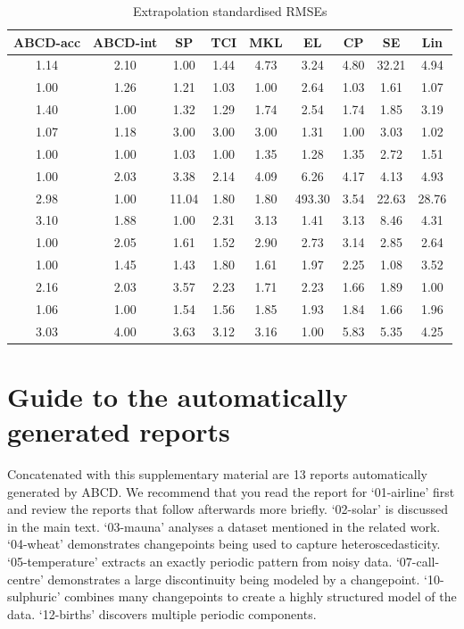 \documentclass[letterpaper]{article}
\newcommand{\procedurename}{ABCD}
\begin{document}
\begin{table}[ht]
\center
\begin{tabular}{|c|c|c|c|c|c|c|c|c|}
\hline
\procedurename{}-acc & \procedurename{}-int & SP & TCI & MKL & EL & CP & SE & Lin \\
\hline
1.14 & 2.10 & 1.00 & 1.44 & 4.73 & 3.24 & 4.80 & 32.21 & 4.94\\
1.00 & 1.26 & 1.21 & 1.03 & 1.00 & 2.64 & 1.03 & 1.61 & 1.07\\
1.40 & 1.00 & 1.32 & 1.29 & 1.74 & 2.54 & 1.74 & 1.85 & 3.19\\
1.07 & 1.18 & 3.00 & 3.00 & 3.00 & 1.31 & 1.00 & 3.03 & 1.02\\
1.00 & 1.00 & 1.03 & 1.00 & 1.35 & 1.28 & 1.35 & 2.72 & 1.51\\
1.00 & 2.03 & 3.38 & 2.14 & 4.09 & 6.26 & 4.17 & 4.13 & 4.93\\
2.98 & 1.00 & 11.04 & 1.80 & 1.80 & 493.30 & 3.54 & 22.63 & 28.76\\
3.10 & 1.88 & 1.00 & 2.31 & 3.13 & 1.41 & 3.13 & 8.46 & 4.31\\
1.00 & 2.05 & 1.61 & 1.52 & 2.90 & 2.73 & 3.14 & 2.85 & 2.64\\
1.00 & 1.45 & 1.43 & 1.80 & 1.61 & 1.97 & 2.25 & 1.08 & 3.52\\
2.16 & 2.03 & 3.57 & 2.23 & 1.71 & 2.23 & 1.66 & 1.89 & 1.00\\
1.06 & 1.00 & 1.54 & 1.56 & 1.85 & 1.93 & 1.84 & 1.66 & 1.96\\
3.03 & 4.00 & 3.63 & 3.12 & 3.16 & 1.00 & 5.83 & 5.35 & 4.25\\
\hline
\end{tabular}
\caption{Extrapolation standardised RMSEs}
\label{table:extrap}
\end{table}

\section{Guide to the automatically generated reports}

Concatenated with this supplementary material are 13 reports automatically generated by \procedurename{}.
We recommend that you read the report for `01-airline' first and review the reports that follow afterwards more briefly.
`02-solar' is discussed in the main text.
`03-mauna' analyses a dataset mentioned in the related work.
`04-wheat' demonstrates changepoints being used to capture heteroscedasticity.
`05-temperature' extracts an exactly periodic pattern from noisy data.
`07-call-centre' demonstrates a large discontinuity being modeled by a changepoint.
`10-sulphuric' combines many changepoints to create a highly structured model of the data.
`12-births' discovers multiple periodic components.

\end{document}
